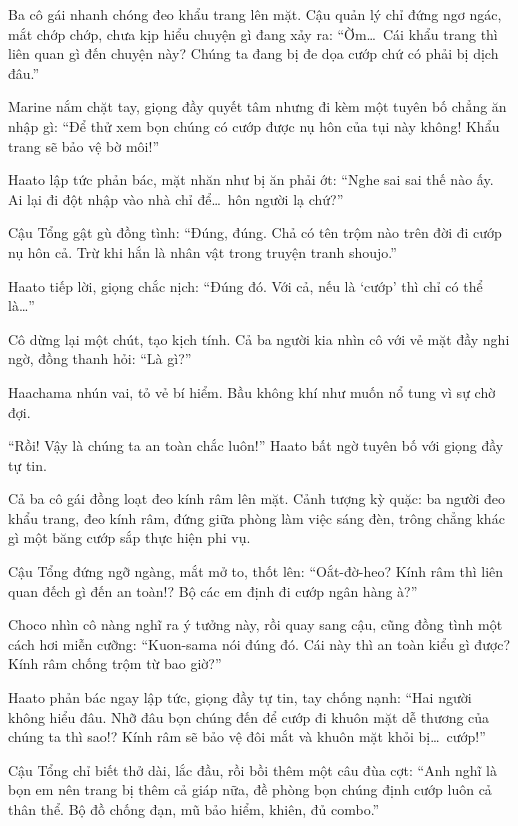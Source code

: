 \documentclass[../main.tex]{subfiles}
\begin{document}
Ba cô gái nhanh chóng đeo khẩu trang lên mặt. Cậu quản lý chỉ đứng ngơ ngác, mắt chớp chớp, chưa kịp hiểu chuyện gì đang xảy ra: ``Ờm\dots\ Cái khẩu trang thì liên quan gì đến chuyện này? Chúng ta đang bị đe dọa cướp chứ có phải bị dịch đâu.''


Marine nắm chặt tay, giọng đầy quyết tâm nhưng đi kèm một tuyên bố chẳng ăn nhập gì: ``Để thử xem bọn chúng có cướp được nụ hôn của tụi này không! Khẩu trang sẽ bảo vệ bờ môi!''

Haato lập tức phản bác, mặt nhăn như bị ăn phải ớt: ``Nghe sai sai thế nào ấy. Ai lại đi đột nhập vào nhà chỉ để\dots\ hôn người lạ chứ?''

Cậu Tổng gật gù đồng tình: ``Đúng, đúng. Chả có tên trộm nào trên đời đi cướp nụ hôn cả. Trừ khi hắn là nhân vật trong truyện tranh shoujo.''

Haato tiếp lời, giọng chắc nịch: ``Đúng đó. Với cả, nếu là `cướp' thì chỉ có thể là\dots''

Cô dừng lại một chút, tạo kịch tính. Cả ba người kia nhìn cô với vẻ mặt đầy nghi ngờ, đồng thanh hỏi: ``Là gì?''

Haachama nhún vai, tỏ vẻ bí hiểm. Bầu không khí như muốn nổ tung vì sự chờ đợi.

\ct

``Rồi! Vậy là chúng ta an toàn chắc luôn!'' Haato bất ngờ tuyên bố với giọng đầy tự tin.

Cả ba cô gái đồng loạt đeo kính râm lên mặt. Cảnh tượng kỳ quặc: ba người đeo khẩu trang, đeo kính râm, đứng giữa phòng làm việc sáng đèn, trông chẳng khác gì một băng cướp sắp thực hiện phi vụ.

Cậu Tổng đứng ngỡ ngàng, mắt mở to, thốt lên: ``Oắt-đờ-heo? Kính râm thì liên quan đếch gì đến an toàn!? Bộ các em định đi cướp ngân hàng à?''


Choco nhìn cô nàng nghĩ ra ý tưởng này, rồi quay sang cậu, cũng đồng tình một cách hơi miễn cưỡng: ``Kuon-sama nói đúng đó. Cái này thì an toàn kiểu gì được? Kính râm chống trộm từ bao giờ?''

Haato phản bác ngay lập tức, giọng đầy tự tin, tay chống nạnh: ``Hai người không hiểu đâu. Nhỡ đâu bọn chúng đến để cướp đi khuôn mặt dễ thương của chúng ta thì sao!? Kính râm sẽ bảo vệ đôi mắt và khuôn mặt khỏi bị\dots\ cướp!''

Cậu Tổng chỉ biết thở dài, lắc đầu, rồi bồi thêm một câu đùa cợt: ``Anh nghĩ là bọn em nên trang bị thêm cả giáp nữa, đề phòng bọn chúng định cướp luôn cả thân thể. Bộ đồ chống đạn, mũ bảo hiểm, khiên, đủ combo.''
\end{document}
